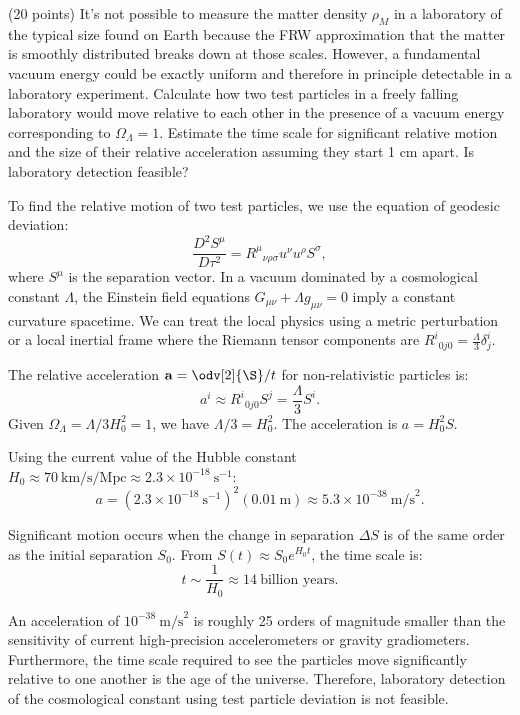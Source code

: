 \begin{problem}
  (20 points) It's not possible to measure the matter density $\rho_M$ in a laboratory of the typical size found on Earth because the FRW approximation that the matter is smoothly distributed breaks down at those scales. However, a fundamental vacuum energy could be exactly uniform and therefore in principle detectable in a laboratory experiment. Calculate how two test particles in a freely falling laboratory would move relative to each other in the presence of a vacuum energy corresponding to $\Omega_\Lambda = 1$. Estimate the time scale for significant relative motion and the size of their relative acceleration assuming they start 1 cm apart. Is laboratory detection feasible?
\end{problem}

\begin{solution}
  To find the relative motion of two test particles, we use the equation of geodesic deviation:
  \[%
    \frac{D^2 S^\mu}{D\tau^2} = R^\mu{}_{\nu\rho\sigma} u^\nu u^\rho S^\sigma
  ,\]%
  where $S^\mu$ is the separation vector. In a vacuum dominated by a cosmological constant $\Lambda$, the Einstein field equations $G_{\mu\nu} + \Lambda g_{\mu\nu} = 0$ imply a constant curvature spacetime. We can treat the local physics using a metric perturbation or a local inertial frame where the Riemann tensor components are $R^i{}_{0j0} = \frac{\Lambda}{3} \delta^i_j$.

  The relative acceleration $\mathbf{a} = \odv[2]{\S}/{t}$ for non-relativistic particles is:
  \[%
    a^i \approx R^i{}_{0j0} S^j = \frac{\Lambda}{3} S^i
  .\]%
  Given $\Omega_\Lambda = \Lambda/3H_0^2 = 1$, we have $\Lambda/3 = H_0^2$. The acceleration is $a = H_0^2 S$.

  Using the current value of the Hubble constant $H_0 \approx 70~\text{km/s/Mpc} \approx 2.3 \times 10^{-18}~\text{s}^{-1}$:
  \[%
    a = (2.3 \times 10^{-18}~\text{s}^{-1})^2 (0.01~\text{m}) \approx 5.3 \times 10^{-38}~\text{m/s}^2
  .\]%

  Significant motion occurs when the change in separation $\Delta S$ is of the same order as the initial separation $S_0$. From $S(t) \approx S_0 e^{H_0 t}$, the time scale is:
  \[%
    t \sim \frac{1}{H_0} \approx 14~\text{billion years}
  .\]%

  An acceleration of $10^{-38}~\text{m/s}^2$ is roughly 25 orders of magnitude smaller than the sensitivity of current high-precision accelerometers or gravity gradiometers. Furthermore, the time scale required to see the particles move significantly relative to one another is the age of the universe. Therefore, laboratory detection of the cosmological constant using test particle deviation is not feasible.
\end{solution}

